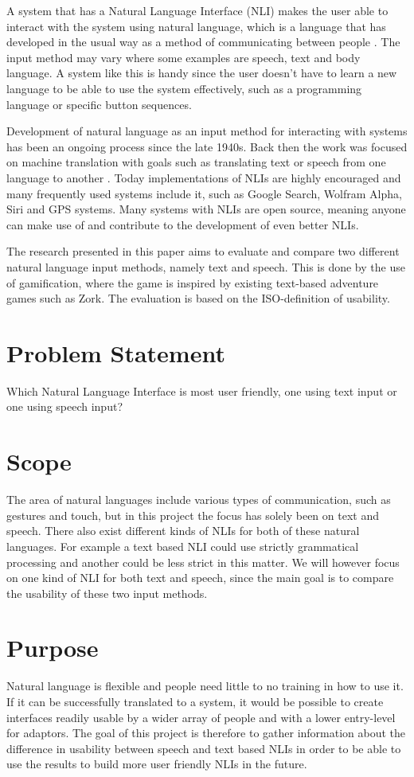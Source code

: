 A system that has a Natural Language Interface (NLI) makes the user able to interact with the system using natural language, which is a language that has developed in the usual way as a method of communicating between people \citep{NatLan}. The input method may vary where some examples are speech, text and body language. A system like this is handy since the user doesn't have to learn a new language to be able to use the system effectively, such as a programming language or specific button sequences.

Development of natural language as an input method for interacting with systems has been an ongoing process since the late 1940s. Back then the work was focused on machine translation with goals such as translating text or speech from one language to another \citep{Jones}. Today implementations of NLIs are highly encouraged and many frequently used systems include it, such as Google Search, Wolfram Alpha, Siri and GPS systems. Many systems with NLIs are open source, meaning anyone can make use of and contribute to the development of even better NLIs.

The research presented in this paper aims to evaluate and compare two different natural language input methods, namely text and speech. This is done by the use of gamification, where the game is inspired by existing text-based adventure games such as Zork. The evaluation is based on the ISO-definition of usability.

\section{Problem Statement}
Which Natural Language Interface is most user friendly, one using text input or one using speech input?

\section{Scope}
The area of natural languages include various types of communication, such as gestures and touch, but in this project the focus has solely been on text and speech. There also exist different kinds of NLIs for both of these natural languages. For example a text based NLI could use strictly grammatical processing and another could be less strict in this matter. We will however focus on one kind of NLI for both text and speech, since the main goal is to compare the usability of these two input methods.

\section{Purpose}
Natural language is flexible and people need little to no training in how to use it. If it can be successfully translated to a system, it would be possible to create interfaces readily usable by a wider array of people and with a lower entry-level for adaptors. The goal of this project is therefore to gather information about the difference in usability between speech and text based NLIs in order to be able to use the results to build more user friendly NLIs in the future.


